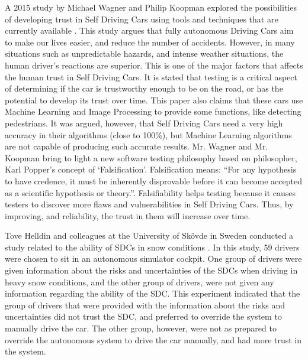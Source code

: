 \documentclass[runningheads,a4paper]{llncs}
\begin{document}
A 2015 study by Michael Wagner and Philip Koopman explored the possibilities of developing trust in Self Driving Cars using tools and techniques that are currently available \cite{wagner2015philosophy}. This study argues that fully autonomous Driving Cars aim to make our lives easier, and reduce the number of accidents. However, in many situations such as unpredictable hazards, and intense weather situations, the human driver's reactions are superior. This is one of the major factors that affects the human trust in Self Driving Cars. It is stated that testing is a critical aspect of determining if the car is trustworthy enough to be on the road, or has the potential to develop its trust over time. This paper also claims that these cars use Machine Learning and Image Processing to provide some functions, like detecting pedestrians. It was argued, however, that Self Driving Cars need a very high accuracy in their algorithms (close to 100\%), but Machine Learning algorithms are not capable of producing such accurate results. Mr. Wagner and Mr. Koopman bring to light a new software testing philosophy based on philosopher, Karl Popper's concept of `Falsification'. Falsification means: ``For any hypothesis to have credence, it must be inherently disprovable before it can become accepted as a scientific hypothesis or theory.''\cite{falsifiability}. Falsifiability helps testing because it causes testers to discover more flaws and vulnerabilities in Self Driving Cars. Thus, by improving, and reliability, the trust in them will increase over time.

Tove Helldin and colleagues at the University of Skövde in Sweden conducted a study related to the ability of SDCs in snow conditions \cite{helldin2013presenting}. In this study, 59 drivers were chosen to sit in an autonomous simulator cockpit. One group of drivers were given information about the risks and uncertainties of the SDCs when driving in heavy snow conditions, and the other group of drivers, were not given any information regarding the ability of the SDC. This experiment indicated that the group of drivers that were provided with the information about the risks and uncertainties did not trust the SDC, and preferred to override the system to manually drive the car. The other group, however, were not as prepared to override the autonomous system to drive the car manually, and had more trust in the system.
\end{document}
